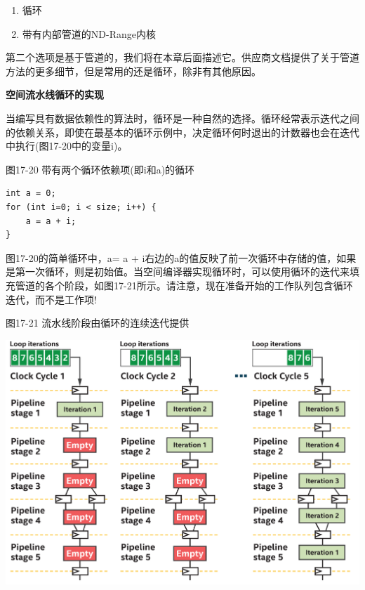 \begin{enumerate}
	\item 循环
	\item 带有内部管道的ND-Range内核
\end{enumerate}

第二个选项是基于管道的，我们将在本章后面描述它。供应商文档提供了关于管道方法的更多细节，但是常用的还是循环，除非有其他原因。\par

\hspace*{\fill} \par %
\textbf{空间流水线循环的实现}

当编写具有数据依赖性的算法时，循环是一种自然的选择。循环经常表示迭代之间的依赖关系，即使在最基本的循环示例中，决定循环何时退出的计数器也会在迭代中执行(图17-20中的变量i)。\par

\hspace*{\fill} \par %
图17-20 带有两个循环依赖项(即i和a)的循环
\begin{lstlisting}[caption={}]
int a = 0;
for (int i=0; i < size; i++) {
	a = a + i;
}
\end{lstlisting}

图17-20的简单循环中，a= a + i右边的a的值反映了前一次循环中存储的值，如果是第一次循环，则是初始值。当空间编译器实现循环时，可以使用循环的迭代来填充管道的各个阶段，如图17-21所示。请注意，现在准备开始的工作队列包含循环迭代，而不是工作项!\par

\hspace*{\fill} \par %
图17-21 流水线阶段由循环的连续迭代提供
\begin{center}
	\includegraphics[width=1.0\textwidth]{content/chapter-17/images/17}
\end{center}

